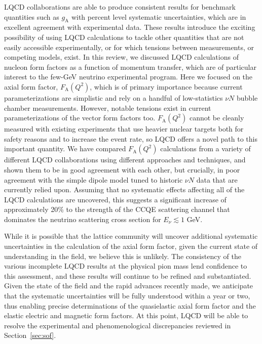 \documentclass{ar-1col}
\begin{document}
LQCD collaborations are able to produce consistent results for benchmark quantities such as $g_{\mathrm{A}}$ with percent level systematic uncertainties, which are in excellent agreement with experimental data.
These results introduce the exciting possibility of using LQCD calculations to tackle other quantities that are not easily accessible experimentally, or for which tensions between measurements, or competing models, exist.
In this review, we discussed LQCD calculations of nucleon form factors as a function of momentum transfer, which are of particular interest to the few-GeV neutrino experimental program.
Here we focused on the axial form factor, $F_{\mathrm{A}}(Q^2)$, which is of primary importance because current parameterizations are simplistic and rely on a handful of low-statistics $\nu N$ bubble chamber measurements.
However, notable tensions exist in current parameterizations of the vector form factors too.
$F_{\mathrm{A}}(Q^2)$ cannot be cleanly measured with existing experiments that use heavier nuclear targets both for safety reasons and to increase the event rate, so LQCD offers a novel path to this important quantity.
We have compared $F_{\mathrm{A}}(Q^2)$ calculations from a variety of different LQCD collaborations using different approaches and techniques, and shown them to be in good agreement with each other, but crucially, in poor agreement with the simple dipole model tuned to historic $\nu N$ data that are currently relied upon.
Assuming that no systematic effects affecting all of the LQCD calculations are uncovered, this suggests a significant increase of approximately 20\% to the strength of the CCQE scattering channel that dominates the neutrino scattering cross section for $E_{\nu} \lesssim 1$ GeV.

While it is possible that the lattice community will uncover additional systematic uncertainties in the calculation of the axial form factor, given the current state of understanding in the field, we believe this is unlikely.  The consistency of the various incomplete LQCD results at the physical pion mass lend confidence to this assessment, and these results will continue to be refined and substantiated.
Given the state of the field and the rapid advances recently made, we anticipate that the systematic uncertainties will be fully understood within a year or two,
 thus enabling precise determinations of the quasielastic axial form factor and the elastic electric and magnetic form factors.
At this point, LQCD will be able to resolve the experimental and phenomenological discrepancies reviewed in Section~\ref{sec:sof}.
\end{document}
